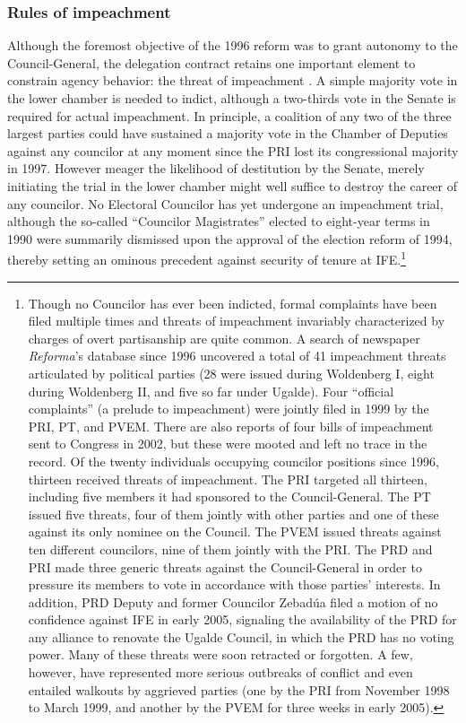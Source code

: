 \documentclass[12 pt, letter]{article}
\begin{document}
\subsubsection{Rules of impeachment}
Although the foremost objective of the 1996 reform was to grant
autonomy to the Council-General, the delegation contract retains one
important element to constrain agency behavior: the threat of
impeachment \citep{Eisenstadt2004}.  A simple majority vote in the
lower chamber is needed to indict, although a two-thirds vote in the
Senate is required for actual impeachment.  In principle, a
coalition of any two of the three largest parties could have
sustained a majority vote in the Chamber of Deputies against any
councilor at any moment since the PRI lost its congressional
majority in 1997.  However meager the likelihood of destitution by
the Senate, merely initiating the trial in the lower chamber might
well suffice to destroy the career of any councilor.  No Electoral
Councilor has yet undergone an impeachment trial, although the
so-called ``Councilor Magistrates'' elected to eight-year terms in
1990 were summarily dismissed upon the approval of the election
reform of 1994, thereby setting an ominous precedent against
security of tenure at IFE.\footnote{Though no Councilor has ever
been indicted, formal complaints have been filed multiple times and
threats of impeachment invariably characterized by charges of overt
partisanship are quite common. A search of newspaper \emph{Reforma}'s database since 1996 uncovered a total of 41 impeachment threats articulated
by political parties (28 were issued during Woldenberg I, eight
during Woldenberg II, and five so far under Ugalde).  Four ``official
complaints'' (a prelude to impeachment) were jointly filed in 1999
by the PRI, PT, and PVEM.  There are also reports of four bills of
impeachment sent to Congress in 2002, but these were mooted and left
no trace in the record.  Of the twenty individuals occupying
councilor positions since 1996, thirteen received threats of
impeachment. The PRI targeted all thirteen, including five members
it had sponsored to the Council-General.  The PT issued five
threats, four of them jointly with other parties and one of these
against its only nominee on the Council.  The PVEM issued threats
against ten different councilors, nine of them jointly with the PRI.
The PRD and PRI made three generic threats against the
Council-General in order to pressure its members to vote in
accordance with those parties' interests. In addition, PRD Deputy
and former Councilor Zebad\'ua filed a motion of no confidence
against IFE in early 2005, signaling the availability of the PRD for
any alliance to renovate the Ugalde Council, in which the PRD has no
voting power.  Many of these threats were soon retracted or
forgotten.  A few, however, have represented more serious outbreaks
of conflict and even entailed walkouts by aggrieved parties (one by
the PRI from November 1998 to March 1999, and another by the PVEM
for three weeks in early 2005).}
\end{document}
